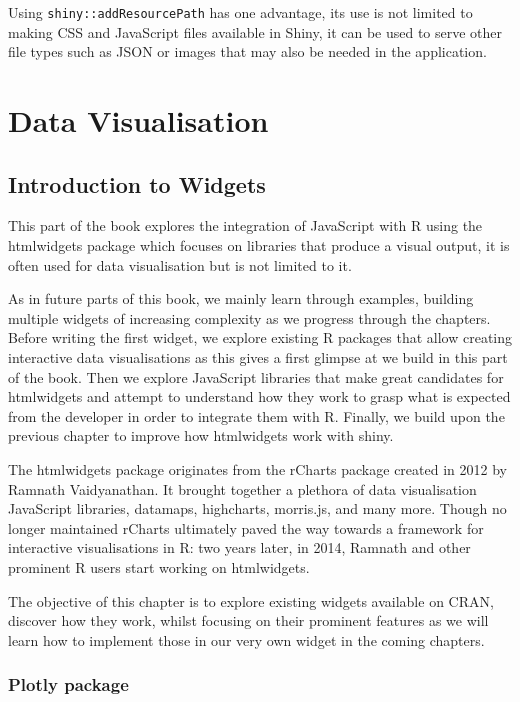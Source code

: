 \documentclass[10pt,]{krantz}
\begin{document}
Using \texttt{shiny::addResourcePath} has one advantage, its use is not limited to making CSS and JavaScript files available in Shiny, it can be used to serve other file types such as JSON or images that may also be needed in the application.

\hypertarget{part-data-visualisation}{%
\part{Data Visualisation}\label{part-data-visualisation}}

\hypertarget{widgets-intro-intro}{%
\chapter{Introduction to Widgets}\label{widgets-intro-intro}}

This part of the book explores the integration of JavaScript with R using the htmlwidgets package which focuses on libraries that produce a visual output, it is often used for data visualisation but is not limited to it.

As in future parts of this book, we mainly learn through examples, building multiple widgets of increasing complexity as we progress through the chapters. Before writing the first widget, we explore existing R packages that allow creating interactive data visualisations as this gives a first glimpse at we build in this part of the book. Then we explore JavaScript libraries that make great candidates for htmlwidgets and attempt to understand how they work to grasp what is expected from the developer in order to integrate them with R. Finally, we build upon the previous chapter to improve how htmlwidgets work with shiny.

The htmlwidgets package originates from the rCharts \citep{R-rCharts} package created in 2012 by Ramnath Vaidyanathan. It brought together a plethora of data visualisation JavaScript libraries, datamaps, highcharts, morris.js, and many more. Though no longer maintained rCharts ultimately paved the way towards a framework for interactive visualisations in R: two years later, in 2014, Ramnath and other prominent R users start working on htmlwidgets.

The objective of this chapter is to explore existing widgets available on CRAN, discover how they work, whilst focusing on their prominent features as we will learn how to implement those in our very own widget in the coming chapters.

\hypertarget{widgets-plotly}{%
\section{Plotly package}\label{widgets-plotly}}
\end{document}
